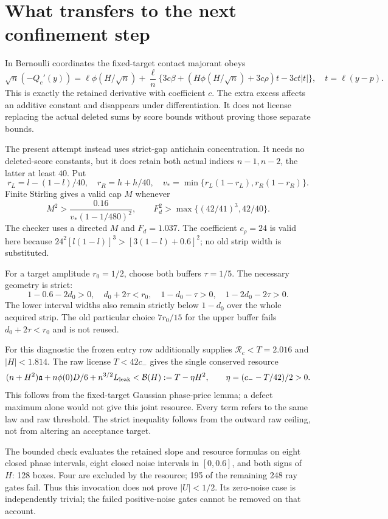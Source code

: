 \documentclass[11pt]{article}
\begin{document}
\section{What transfers to the next confinement step}
In Bernoulli coordinates the fixed-target contact majorant obeys
\[
 \sqrt n(-Q_c'(y))=\ell\phi(H/\sqrt n)
 +\frac\ell n\{3c\beta+(H\phi(H/\sqrt n)+3c\rho)t-3ct|t|\},
 \quad t=\ell(y-p).
\]
This is exactly the retained derivative with coefficient $c$.
The extra excess affects an additive constant and disappears under
differentiation. It does not license replacing the actual deleted sums
by score bounds without proving those separate bounds.

The present attempt instead uses strict-gap antichain concentration.
It needs no deleted-score constants, but it does retain both actual
indices $n-1,n-2$, the latter at least $40$. Put
\[
 r_L=l-(1-l)/40,\quad r_R=h+h/40,\quad
 v_* =\min\{r_L(1-r_L),r_R(1-r_R)\}.
\]
Finite Stirling gives a valid cap $M$ whenever
\[
 M^2>\frac{0.16}{v_*(1-1/480)^2},\qquad
 F_d^2>\max\{(42/41)^3,42/40\}.
\]
The checker uses a directed $M$ and $F_d=1.037$.
The coefficient $c_\rho=24$ is valid here because
$24^2[l(1-l)]^3>[3(1-l)+0.6]^2$; no old strip width is substituted.

For a target amplitude $r_0=1/2$, choose both buffers $\tau=1/5$.
The necessary geometry is strict:
\[
 1-0.6-2d_0>0,\quad d_0+2\tau<r_0,\quad
 1-d_0-\tau>0,\quad1-2d_0-2\tau>0.
\]
The lower interval widths also remain strictly below $1-d_0$ over
the whole acquired strip. The old particular choice $7r_0/15$ for
the upper buffer fails $d_0+2\tau<r_0$ and is not reused.

For this diagnostic the frozen entry row additionally supplies
$\mathcal R_c< T=2.016$ and $|H|<1.814$.
The raw license $T<42c_-$ gives the single conserved resource
\[
 (n+H^2)\mathfrak a+n\phi(0)D/6+n^{3/2}L_{\rm leak}
 <\mathcal B(H):=T-\eta H^2,
 \qquad \eta=(c_- -T/42)/2>0.
\]
This follows from the fixed-target Gaussian phase-price lemma; a defect
maximum alone would not give this joint resource. Every term refers to
the same law and raw threshold. The strict inequality follows from the
outward raw ceiling, not from altering an acceptance target.

The bounded check evaluates the retained slope and resource formulas on
eight closed phase intervals, eight closed noise intervals in $[0,0.6]$,
and both signs of $H$: 128 boxes. Four are excluded by the resource; 195
of the remaining 248 ray gates fail. Thus this invocation does not prove
$|U|<1/2$. Its zero-noise case is independently trivial; the failed
positive-noise gates cannot be removed on that account.
\end{document}
